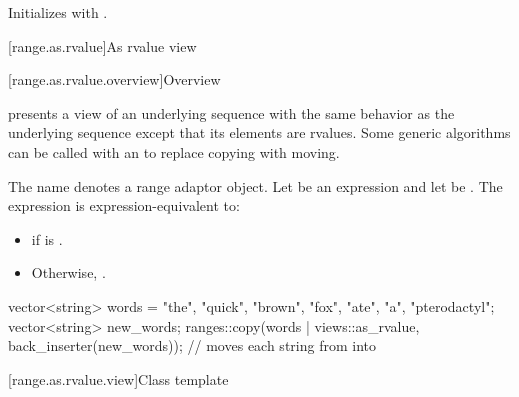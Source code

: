 \begin{itemdescr}
\pnum
\effects
Initializes  with .
\end{itemdescr}

[range.as.rvalue]{As rvalue view}

[range.as.rvalue.overview]{Overview}

\pnum
{} presents a view of an underlying sequence
with the same behavior as the underlying sequence
except that its elements are rvalues.
Some generic algorithms can be called with an 
to replace copying with moving.

\pnum
{}%
The name  denotes
a range adaptor object.
Let  be an expression and let  be .
The expression  is expression-equivalent to:
\begin{itemize}
\item
{} if  is .
\item
Otherwise, .
\end{itemize}

\pnum
\begin{example}
\begin{codeblock}
vector<string> words = {"the", "quick", "brown", "fox", "ate", "a", "pterodactyl"};
vector<string> new_words;
ranges::copy(words | views::as_rvalue, back_inserter(new_words));
  // moves each string from  into 
\end{codeblock}
\end{example}

[range.as.rvalue.view]{Class template }

